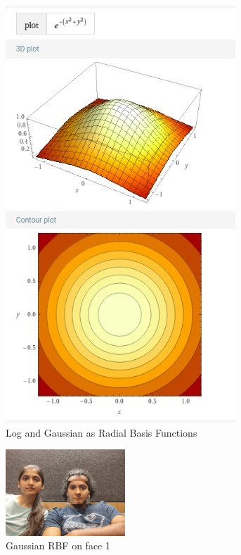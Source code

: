 \documentclass[conference]{IEEEtran}
\begin{document}
\begin{figure}[!htbp]
  \includegraphics[width=\linewidth]{media/RBF_gaussian.jpg}
\endminipage
\caption{Log and Gaussian as Radial Basis Functions}
\label{fig:rbf}
\end{figure}

\begin{figure}[!htbp]
\centering
\includegraphics[width=0.4\textwidth]{media/incorporate_gaussian_face1.jpg}
\caption{Gaussian RBF on face 1}
\label{fig:inc_gaussian_rbf_face1}
\end{figure}
\end{document}
